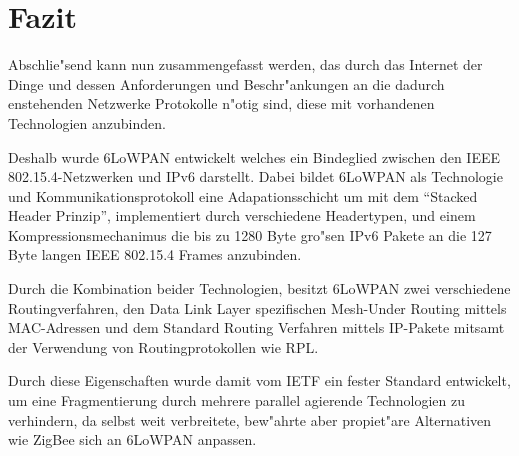 \documentclass[final]{lktseminar}
\begin{document}
\section{Fazit}
\label{sec:Fazit}
Abschlie"send kann nun zusammengefasst werden, das durch das Internet der Dinge
und dessen Anforderungen und Beschr"ankungen an die dadurch enstehenden Netzwerke
Protokolle n"otig sind, diese mit vorhandenen Technologien anzubinden.

Deshalb wurde 6LoWPAN entwickelt welches ein Bindeglied zwischen den
IEEE 802.15.4-Netzwerken und IPv6 darstellt. Dabei bildet 6LoWPAN als
Technologie und Kommunikationsprotokoll eine Adapationsschicht um mit dem
``Stacked Header Prinzip'', implementiert durch verschiedene Headertypen, und
einem Kompressionsmechanimus die bis zu 1280 Byte gro"sen IPv6 Pakete an die
127 Byte langen IEEE 802.15.4 Frames anzubinden.

Durch die Kombination beider Technologien, besitzt 6LoWPAN zwei verschiedene
Routingverfahren, den Data Link Layer spezifischen Mesh-Under Routing mittels
MAC-Adressen und dem Standard Routing Verfahren mittels IP-Pakete mitsamt der
Verwendung von Routingprotokollen wie RPL.

Durch diese Eigenschaften wurde damit vom IETF ein fester Standard entwickelt,
um eine Fragmentierung durch mehrere parallel agierende Technologien zu verhindern,
da selbst weit verbreitete, bew"ahrte aber propiet"are Alternativen wie ZigBee
sich an 6LoWPAN anpassen.




\printbibliography
\end{document}
